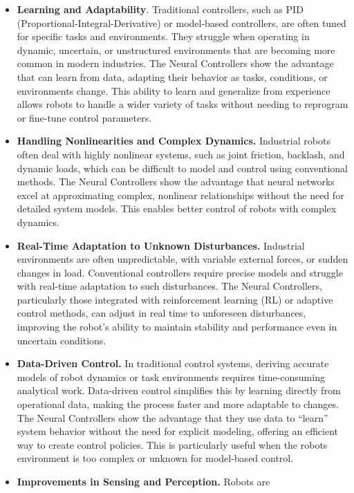 \begin{itemize}
\item
  \textbf{Learning and Adaptability}. Traditional controllers, such as
  PID (Proportional-Integral-Derivative) or model-based controllers, are
  often tuned for specific tasks and environments. They struggle when
  operating in dynamic, uncertain, or unstructured environments that are
  becoming more common in modern industries. The Neural Controllers show
  the advantage that can learn from data, adapting their behavior as
  tasks, conditions, or environments change. This ability to learn and
  generalize from experience allows robots to handle a wider variety of
  tasks without needing to reprogram or fine-tune control parameters.
\item
  \textbf{Handling Nonlinearities and Complex Dynamics.} Industrial
  robots often deal with highly nonlinear systems, such as joint
  friction, backlash, and dynamic loads, which can be difficult to model
  and control using conventional methods. The Neural Controllers show
  the advantage that neural networks excel at approximating complex,
  nonlinear relationships without the need for detailed system models.
  This enables better control of robots with complex dynamics.
\item
  \textbf{Real-Time Adaptation to Unknown Disturbances.} Industrial
  environments are often unpredictable, with variable external forces,
  or sudden changes in load. Conventional controllers require precise
  models and struggle with real-time adaptation to such disturbances.
  The Neural Controllers, particularly those integrated with
  reinforcement learning (RL) or adaptive control methods, can adjust in
  real time to unforeseen disturbances, improving the robot's ability to
  maintain stability and performance even in uncertain conditions.
\item
  \textbf{Data-Driven Control.} In traditional control systems, deriving
  accurate models of robot dynamics or task environments requires
  time-consuming analytical work. Data-driven control simplifies this by
  learning directly from operational data, making the process faster and
  more adaptable to changes. The Neural Controllers show the advantage
  that they use data to ``learn'' system behavior without the need for
  explicit modeling, offering an efficient way to create control
  policies. This is particularly useful when the robot\textquotesingle s
  environment is too complex or unknown for model-based control.
\item
  \textbf{Improvements in Sensing and Perception.} Robots are

\end{itemize}

